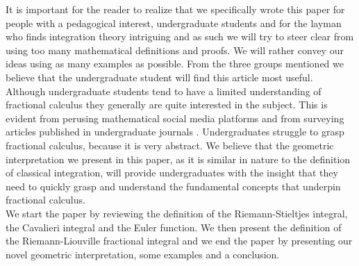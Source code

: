 \documentclass{article}
\theoremstyle{theorem}
\theoremstyle{definition}
\begin{document}
\noindent
It is important for the reader to realize that we specifically wrote this paper for people with a pedagogical interest, undergraduate students and for the layman who finds integration theory intriguing and 
as such we will try to steer clear from using too many mathematical definitions and proofs. We will rather convey our ideas using as many examples as possible. From the 
three groups mentioned we believe that the undergraduate student will find this article most useful. Although undergraduate students tend to have a limited understanding of 
fractional calculus they generally are quite interested in the subject. This is evident from perusing mathematical social media platforms and from surveying 
articles published in undergraduate journals \cite{munkhammar05}. Undergraduates struggle to grasp fractional calculus, because it is very abstract. We believe that the geometric interpretation we present in this paper, as it is similar in nature to the definition of classical integration, will provide undergraduates with the insight that they need to quickly grasp and understand the fundamental 
concepts that underpin fractional calculus.\\


\noindent
We start the paper by reviewing the definition of the Riemann-Stieltjes integral, the Cavalieri integral and the Euler function. We then present the definition of the Riemann-Liouville fractional integral and we end the paper by presenting our novel geometric interpretation, some examples and a conclusion.

\end{document}
